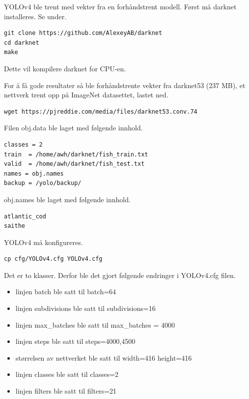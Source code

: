 YOLOv4 ble trent med vekter fra en forhåndstrent modell. Først må darknet installeres. Se under.

\begin{verbatim}
git clone https://github.com/AlexeyAB/darknet
cd darknet
make  
\end{verbatim}

Dette vil kompilere darknet for CPU-en.


For å få gode resultater så ble forhåndstrente vekter fra darknet53 (237 MB), et nettverk trent opp på ImageNet datasettet, lastet ned.

\begin{verbatim}
wget https://pjreddie.com/media/files/darknet53.conv.74
\end{verbatim}

Filen obj.data ble laget med følgende innhold.

\begin{lstlisting}[language={}, caption=obj.data]
classes = 2
train  = /home/awh/darknet/fish_train.txt
valid  = /home/awh/darknet/fish_test.txt
names = obj.names
backup = /yolo/backup/
\end{lstlisting}

obj.names ble laget med følgende innhold.

\begin{lstlisting}[language={}, caption=obj.names]
atlantic_cod
saithe
\end{lstlisting}

YOLOv4 må konfigureres.

\begin{verbatim}
cp cfg/YOLOv4.cfg YOLOv4.cfg
\end{verbatim}

Det er to klasser. Derfor ble det gjort følgende endringer i YOLOv4.cfg filen.

\begin{itemize}
  \item linjen batch ble satt til batch=64
  \item linjen subdivisions ble satt til subdivisions=16
  \item linjen max\_batches ble satt til max\_batches = 4000
  \item linjen steps ble satt til steps=4000,4500
  \item størrelsen av nettverket ble satt til width=416 height=416
  \item linjen classes ble satt til classes=2
  \item linjen filters ble satt til filters=21
\end{itemize}

